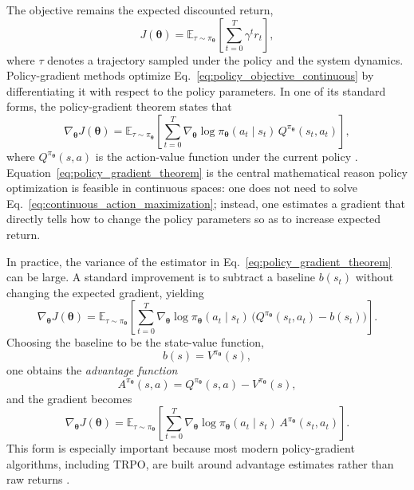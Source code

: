 The objective remains the expected discounted return,
\begin{equation}
J(\bm{\theta})
=
\mathbb{E}_{\tau\sim\pi_{\bm{\theta}}}
\left[
\sum_{t=0}^{T}
\gamma^{t} r_t
\right],
\label{eq:policy_objective_continuous}
\end{equation}
where $\tau$ denotes a trajectory sampled under the policy and the system dynamics. Policy-gradient methods optimize Eq.~\eqref{eq:policy_objective_continuous} by differentiating it with respect to the policy parameters. In one of its standard forms, the policy-gradient theorem states that
\begin{equation}
\nabla_{\bm{\theta}} J(\bm{\theta})
=
\mathbb{E}_{\tau\sim\pi_{\bm{\theta}}}
\left[
\sum_{t=0}^{T}
\nabla_{\bm{\theta}}
\log \pi_{\bm{\theta}}(a_t\mid s_t)\,
Q^{\pi_{\bm{\theta}}}(s_t,a_t)
\right],
\label{eq:policy_gradient_theorem}
\end{equation}
where $Q^{\pi_{\bm{\theta}}}(s,a)$ is the action-value function under the current policy \cite{Sutton2000,SuttonBarto2018}. Equation~\eqref{eq:policy_gradient_theorem} is the central mathematical reason policy optimization is feasible in continuous spaces: one does not need to solve Eq.~\eqref{eq:continuous_action_maximization}; instead, one estimates a gradient that directly tells how to change the policy parameters so as to increase expected return.

In practice, the variance of the estimator in Eq.~\eqref{eq:policy_gradient_theorem} can be large. A standard improvement is to subtract a baseline $b(s_t)$ without changing the expected gradient, yielding
\begin{equation}
\nabla_{\bm{\theta}} J(\bm{\theta})
=
\mathbb{E}_{\tau\sim\pi_{\bm{\theta}}}
\left[
\sum_{t=0}^{T}
\nabla_{\bm{\theta}}
\log \pi_{\bm{\theta}}(a_t\mid s_t)\,
\bigl(
Q^{\pi_{\bm{\theta}}}(s_t,a_t)-b(s_t)
\bigr)
\right].
\label{eq:policy_gradient_with_baseline}
\end{equation}
Choosing the baseline to be the state-value function,
\begin{equation}
b(s)=V^{\pi_{\bm{\theta}}}(s),
\label{eq:value_baseline}
\end{equation}
one obtains the \emph{advantage function}
\begin{equation}
A^{\pi_{\bm{\theta}}}(s,a)
=
Q^{\pi_{\bm{\theta}}}(s,a)-V^{\pi_{\bm{\theta}}}(s),
\label{eq:advantage_definition}
\end{equation}
and the gradient becomes
\begin{equation}
\nabla_{\bm{\theta}} J(\bm{\theta})
=
\mathbb{E}_{\tau\sim\pi_{\bm{\theta}}}
\left[
\sum_{t=0}^{T}
\nabla_{\bm{\theta}}
\log \pi_{\bm{\theta}}(a_t\mid s_t)\,
A^{\pi_{\bm{\theta}}}(s_t,a_t)
\right].
\label{eq:advantage_policy_gradient}
\end{equation}
This form is especially important because most modern policy-gradient algorithms, including TRPO, are built around advantage estimates rather than raw returns \cite{Schulman2015,SuttonBarto2018}.

